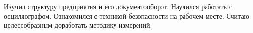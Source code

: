 Изучил структуру предприятия и его документооборот. %
Научился работать с осциллографом. %
Ознакомился с техникой безопасности на рабочем месте. %
Считаю целесообразным доработать методику измерений. %
